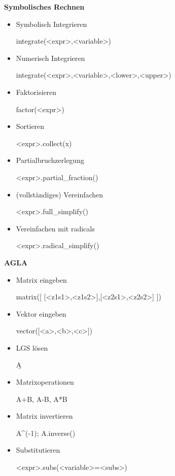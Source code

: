 \documentclass[a4paper,9pt,DIV15,twocolumn]{scrartcl}
\begin{document}
\textbf{Symbolisches Rechnen}
\begin{itemize}
\item Symbolisch Integrieren
\begin{sagein}
integrate(<expr>,<variable>)
\end{sagein}
 \item Numerisch Integrieren 
\begin{sagein}
integrate(<expr>,<variable>,<lower>,<upper>)
\end{sagein}
\item Faktorisieren 
\begin{sagein}
factor(<expr>)
\end{sagein}
\item Sortieren 
\begin{sagein}
<expr>.collect(x)
\end{sagein}
\item Partialbruchzerlegung 
\begin{sagein}
<expr>.partial_fraction()
\end{sagein}
\item (vollständiges) Vereinfachen 
\begin{sagein}
<expr>.full_simplify()
\end{sagein}
\item Vereinfachen mit radicals 
\begin{sagein}
<expr>.radical_simplify()
\end{sagein}
\end{itemize}

\textbf{AGLA}
\begin{itemize}
\item Matrix eingeben 
\begin{sagein}
matrix([ [<z1s1>,<z1s2>],[<z2s1>,<z2s2>] ])
\end{sagein}
 \item Vektor eingeben 
\begin{sagein}
vector([<a>,<b>,<c>])
\end{sagein}
\item LGS lösen 
\begin{sagein}
A\b
\end{sagein}
\item Matrixoperationen 
\begin{sagein}
A+B, A-B, A*B
\end{sagein}
\item Matrix invertieren 
\begin{sagein}
A^(-1); A.inverse()
\end{sagein}
\item Substitutieren 
\begin{sagein}
<expr>.subs(<variable>=<subs>)
\end{sagein}
\end{itemize}
\end{document}
